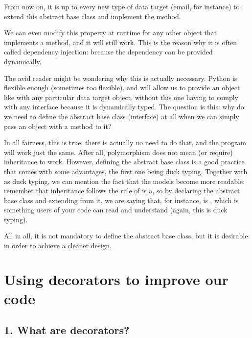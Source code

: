 \documentclass[a4paper,10pt,english]{sphinxmanual}
\begin{document}
From now on, it is up to every new type of data target (email, for instance) to extend this
abstract base class and implement the  method.

We can even modify this property at runtime for any other object that implements a
 method, and it will still work. This is the reason why it is often called dependency
injection: because the dependency can be provided dynamically.

The avid reader might be wondering why this is actually necessary. Python is flexible
enough (sometimes too flexible), and will allow us to provide an object like
 with any particular data target object, without this one having to comply
with any interface because it is dynamically typed. The question is this: why do we need to
define the abstract base class (interface) at all when we can simply pass an object with a
 method to it?

In all fairness, this is true; there is actually no need to do that, and the program will work
just the same. After all, polymorphism does not mean (or require) inheritance to work.
However, defining the abstract base class is a good practice that comes with some
advantages, the first one being duck typing. Together with as duck typing, we can mention
the fact that the models become more readable: remember that inheritance follows the rule
of is a, so by declaring the abstract base class and extending from it, we are saying that, for
instance,  is , which is something users of your code can read
and understand (again, this is duck typing).

All in all, it is not mandatory to define the abstract base class, but it is desirable in order to
achieve a cleaner design.


\chapter{Using decorators to improve our code}
\label{\detokenize{chapters/5_decorators/index:using-decorators-to-improve-our-code}}\label{\detokenize{chapters/5_decorators/index::doc}}

\section{1. What are decorators?}
\label{\detokenize{chapters/5_decorators/index:what-are-decorators}}
\end{document}
